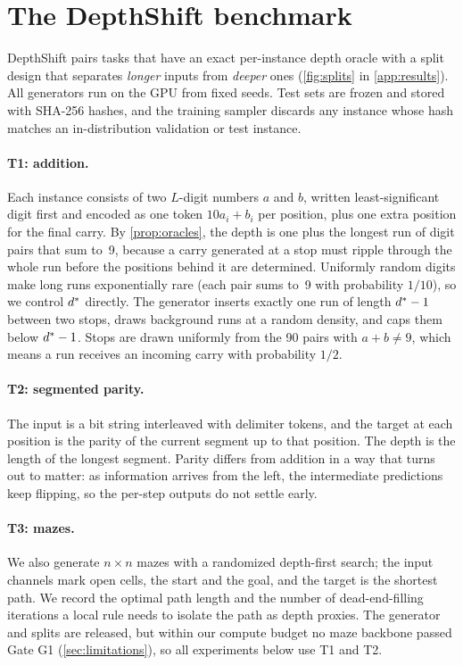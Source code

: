 \section{The DepthShift benchmark}
\label{sec:benchmark}

DepthShift pairs tasks that have an exact per-instance depth oracle with a split design that
separates \emph{longer} inputs from \emph{deeper} ones (\cref{fig:splits} in \cref{app:results}). All generators run on the GPU
from fixed seeds. Test sets are frozen and stored with SHA-256 hashes, and the training sampler
discards any instance whose hash matches an in-distribution validation or test instance.

\paragraph{T1: addition.} Each instance consists of two $L$-digit numbers $a$ and $b$, written
least-significant digit first and encoded as one token $10a_i+b_i$ per position, plus one extra position
for the final carry. By \cref{prop:oracles}, the depth is one plus the longest run of digit pairs that
sum to~9, because a carry generated at a stop must ripple through the whole run before the positions
behind it are determined. Uniformly random digits make long runs exponentially rare (each pair sums
to~9 with probability $1/10$), so we control $d^{*}$ directly. The generator inserts exactly one run of
length $d^{*}-1$ between two stops, draws background runs at a random density, and caps them below
$d^{*}-1$. Stops are drawn uniformly from the 90 pairs with $a+b\ne 9$, which means a run receives an
incoming carry with probability $1/2$.

\paragraph{T2: segmented parity.} The input is a bit string interleaved with delimiter tokens, and the
target at each position is the parity of the current segment up to that position. The depth is the
length of the longest segment. Parity differs from addition in a way that turns out to matter: as
information arrives from the left, the intermediate predictions keep flipping, so the per-step outputs
do not settle early.

\paragraph{T3: mazes.} We also generate $n\times n$ mazes with a randomized depth-first search; the
input channels mark open cells, the start and the goal, and the target is the shortest path. We
record the optimal path length and the number of dead-end-filling iterations a local rule needs to
isolate the path as depth proxies. The generator and splits are released, but within our compute
budget no maze backbone passed Gate G1 (\cref{sec:limitations}), so all experiments below use T1 and
T2.

